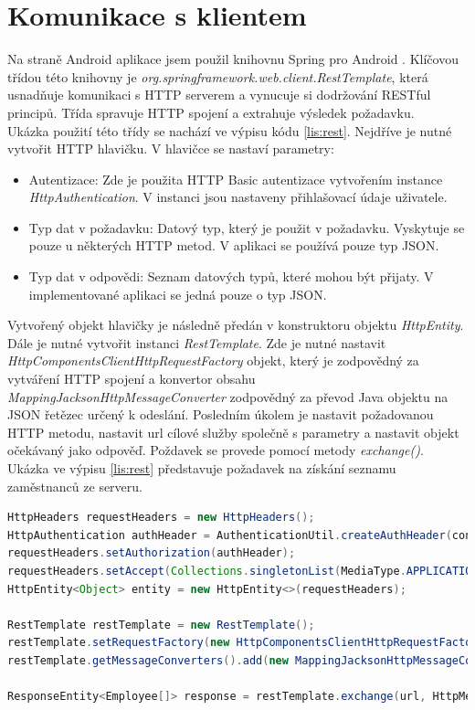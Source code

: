 \documentclass{diplomka}
\begin{document}
\section{Komunikace s klientem}
Na straně Android aplikace jsem použil knihovnu Spring pro Android \cite{springandroid}. Klíčovou třídou této knihovny je \emph{org.springframework.web.client.RestTemplate}, která usnadňuje komunikaci s HTTP serverem a vynucuje si dodržování RESTful principů. Třída spravuje HTTP spojení a extrahuje výsledek požadavku.\\ \indent
Ukázka použití této třídy se nachází ve výpisu kódu \ref{lis:rest}. Nejdříve je nutné vytvořit HTTP hlavičku. V hlavičce se nastaví parametry: 
\begin{itemize}[noitemsep,nolistsep]
\item Autentizace: Zde je použita HTTP Basic autentizace vytvořením instance \emph{HttpAuthentication}. V instanci jsou nastaveny přihlašovací údaje uživatele.
\item Typ dat v požadavku: Datový typ, který je použit v požadavku. Vyskytuje se pouze u některých HTTP metod. V aplikaci se používá pouze typ JSON.
\item Typ dat v odpovědi: Seznam datových typů, které mohou být přijaty. V implementované aplikaci se jedná pouze o typ JSON.
\end{itemize}
Vytvořený objekt hlavičky je následně předán v konstruktoru objektu \emph{HttpEntity}. Dále je nutné vytvořit instanci \emph{RestTemplate}. Zde je nutné nastavit \emph{HttpComponentsClientHttpRequestFactory} objekt, který je zodpovědný za vytváření HTTP spojení a konvertor obsahu \emph{MappingJacksonHttpMessageConverter} zodpovědný za převod Java objektu na JSON řetězec určený k odeslání. Posledním úkolem je nastavit požadovanou HTTP metodu, nastavit url cílové služby společně s parametry a nastavit objekt očekávaný jako odpověď. Poždavek se provede pomocí metody \emph{exchange()}. Ukázka ve výpisu \ref{lis:rest} představuje požadavek na získání seznamu zaměstnanců ze serveru.

\begin{lstlisting}[language=Java, caption={Ukázka použití},label={lis:rest}]
HttpHeaders requestHeaders = new HttpHeaders();
HttpAuthentication authHeader = AuthenticationUtil.createAuthHeader(context);
requestHeaders.setAuthorization(authHeader);
requestHeaders.setAccept(Collections.singletonList(MediaType.APPLICATION_JSON));
HttpEntity<Object> entity = new HttpEntity<>(requestHeaders);

RestTemplate restTemplate = new RestTemplate();
restTemplate.setRequestFactory(new HttpComponentsClientHttpRequestFactory(HttpClientFactory.getThreadSafeClient()));
restTemplate.getMessageConverters().add(new MappingJacksonHttpMessageConverter());

ResponseEntity<Employee[]> response = restTemplate.exchange(url, HttpMethod.GET, entity, Employee[].class, icp);
\end{lstlisting}
\end{document}
